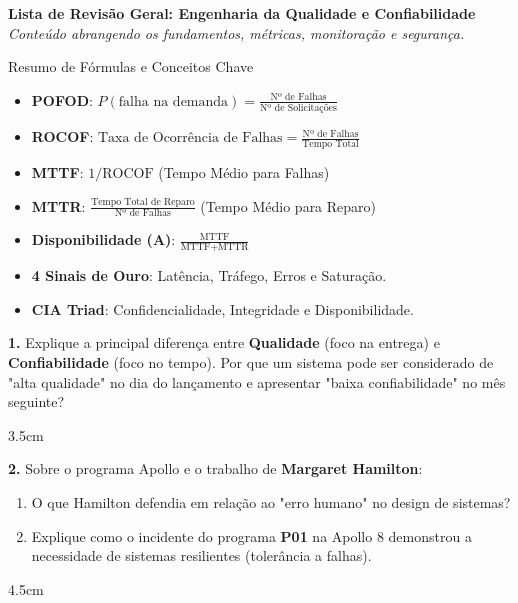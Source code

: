 \documentclass[12pt]{article}
\begin{document}

\begin{center}
  {\Large \textbf{Lista de Revisão Geral: Engenharia da Qualidade e Confiabilidade}}\\[0.2cm]
  \textit{Conteúdo abrangendo os fundamentos, métricas, monitoração e segurança.}
\end{center}

\vspace{0.4cm}

\begin{block}{Resumo de Fórmulas e Conceitos Chave}
  \small
  \begin{itemize}
    \item \textbf{POFOD}: $P(\text{falha na demanda}) = \frac{\text{Nº de Falhas}}{\text{Nº de Solicitações}}$
    \item \textbf{ROCOF}: $\text{Taxa de Ocorrência de Falhas} = \frac{\text{Nº de Falhas}}{\text{Tempo Total}}$
    \item \textbf{MTTF}: $1 / \text{ROCOF}$ (Tempo Médio para Falhas)
    \item \textbf{MTTR}: $\frac{\text{Tempo Total de Reparo}}{\text{Nº de Falhas}}$ (Tempo Médio para Reparo)
    \item \textbf{Disponibilidade (A)}: $\frac{\text{MTTF}}{\text{MTTF} + \text{MTTR}}$
    \item \textbf{4 Sinais de Ouro}: Latência, Tráfego, Erros e Saturação.
    \item \textbf{CIA Triad}: Confidencialidade, Integridade e Disponibilidade.
  \end{itemize}
\end{block}




\textbf{1.} Explique a principal diferença entre \textbf{Qualidade} (foco na entrega) e \textbf{Confiabilidade} (foco no tempo). Por que um sistema pode ser considerado de "alta qualidade" no dia do lançamento e apresentar "baixa confiabilidade" no mês seguinte?
\begin{resposta}{3.5cm}
\end{resposta}

\textbf{2.} Sobre o programa Apollo e o trabalho de \textbf{Margaret Hamilton}:
\begin{enumerate}[label=\alph*)]
    \item O que Hamilton defendia em relação ao "erro humano" no design de sistemas?
    \item Explique como o incidente do programa \textbf{P01} na Apollo 8 demonstrou a necessidade de sistemas resilientes (tolerância a falhas).
\end{enumerate}
\begin{resposta}{4.5cm}
\end{resposta}
\end{document}
